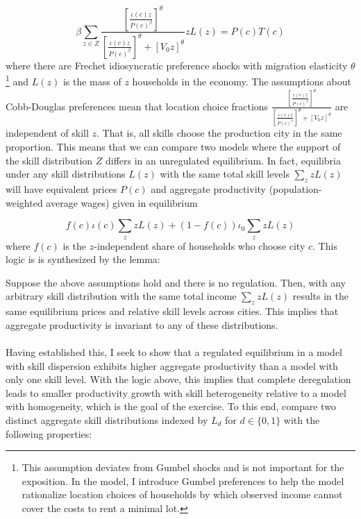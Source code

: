 \documentclass[12pt]{article}
\begin{document}
	\begin{equation}
		\beta \sum_{z \in Z} \frac{[\frac{\iota(c)z}{P(c)^{\beta}}]^{\theta}}{[\frac{\iota(c)z}{P(c)^{\beta}}]^{\theta} + [V_{0}z]^{\theta}}zL(z) = P(c)T(c)
	\end{equation}
	where there are Frechet idiosyncratic preference shocks with migration elasticity $\theta$\footnote{This assumption deviates from Gumbel shocks and is not important for the exposition. In the model, I introduce Gumbel preferences to help the model rationalize location choices of households by which observed income cannot cover the costs to rent a minimal lot. } and $L(z)$ is the mass of $z$ households in the economy. The assumptions about Cobb-Douglas preferences mean that location choice fractions $\frac{[\frac{\iota(c)z}{P(c)^{\beta}}]^{\theta}}{[\frac{\iota(c)z}{P(c)^{\beta}}]^{\theta} + [V_{0}z]^{\theta}}$ are independent of skill $z$. That is, all skills choose the production city in the same proportion. This means that we can compare two models where the support of the skill distribution $Z$ differs in an unregulated equilibrium. In fact, equilibria under any skill distributions $L(z)$ with the same total skill levels $\sum_{z}zL(z)$ will have equivalent prices $P(c)$ and aggregate productivity (population-weighted average wages) given in equilibrium
	
	\begin{equation}
		f(c)\iota(c)\sum_{z}zL(z) + (1-f(c))\iota_{0}\sum_{z}zL(z)
	\end{equation}
	where $f(c)$ is the $z$-independent share of households who choose city $c$. This logic is is synthesized by the lemma:
	
	\begin{Lemma}
		Suppose the above assumptions hold and there is no regulation. Then, with any arbitrary skill distribution with the same total income $\sum_{z}zL(z)$ results in the same equilibrium prices and relative skill levels across cities. This implies that aggregate productivity is invariant to any of these distributions.
	\end{Lemma}
	
	\paragraph*{}
	Having established this, I seek to show that a regulated equilibrium in a model with skill dispersion exhibits higher aggregate productivity than a model with only one skill level. With the logic above, this implies that complete deregulation leads to smaller productivity growth with skill heterogeneity relative to a model with homogeneity, which is the goal of the exercise. To this end, compare two distinct aggregate skill distributions indexed by $L_{d}$ for $d \in \{0, 1\}$ with the following properties:
	
\end{document}
